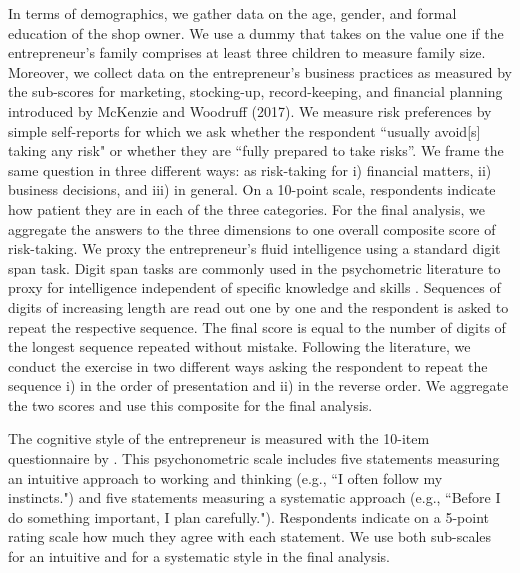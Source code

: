 \documentclass[11.5pt]{article}
\begin{document}
In terms of demographics, we gather data on the age, gender, and formal education of the shop owner. We use a dummy that takes on the value one if the entrepreneur's family comprises at least three children to measure family size. Moreover, we collect data on the entrepreneur's business practices as measured by the sub-scores for marketing, stocking-up, record-keeping, and financial planning introduced by McKenzie and Woodruff (2017). We measure risk preferences by simple self-reports for which we ask whether the respondent ``usually avoid[s] taking any risk" or whether they are  ``fully prepared to take risks''. We frame the same question in three different ways: as risk-taking for i) financial matters, ii) business decisions, and iii) in general. On a 10-point scale, respondents indicate how patient they are in each of the three categories. For the final analysis, we aggregate the answers to the three dimensions to one overall composite score of risk-taking. We proxy the entrepreneur's fluid intelligence using a standard digit span task. Digit span tasks are commonly used in the psychometric literature to proxy for intelligence independent of specific knowledge and skills \citep[see, e.g.,][]{Engle1999, Hale2002, Colom2005, Kane2005}. Sequences of digits of increasing length are read out one by one and the respondent is asked to repeat the respective sequence. The final score is equal to the number of digits of the longest sequence repeated without mistake. Following the literature, we conduct the exercise in two different ways asking the respondent to repeat the sequence i) in the order of presentation and ii) in the reverse order. We aggregate the two scores and use this composite for the final analysis.

The cognitive style of the entrepreneur is measured with the 10-item questionnaire by \citet{Sagiv2010}. This psychonometric scale includes five statements measuring an intuitive approach to working and thinking (e.g., ``I often follow my instincts.") and five statements measuring a systematic approach (e.g., ``Before I do something important, I plan carefully."). Respondents indicate on a 5-point rating scale how much they agree with each statement. We use both sub-scales for an intuitive and for a systematic style in the final analysis. %

\end{document}
